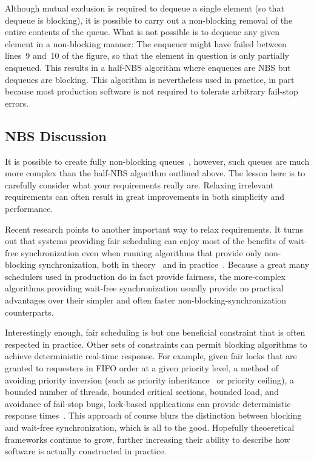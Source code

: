 Although mutual exclusion is required to dequeue a single element
(so that dequeue is blocking), it is possible to carry out a non-blocking
removal of the entire contents of the queue.
What is not possible is to dequeue any given element in a non-blocking
manner: The enqueuer might have failed between lines~9 and~10 of the
figure, so that the element in question is only partially enqueued.
This results in a half-NBS algorithm where enqueues are NBS but
dequeues are blocking.
This algorithm is nevertheless used in practice, in part because
most production software is not required to tolerate arbitrary fail-stop
errors.

\subsection{NBS Discussion}
\label{sec:advsync:NBS Discussion}

It is possible to create fully non-blocking queues~\cite{MichaelScott96},
however, such queues are much more complex than the half-NBS algorithm
outlined above.
The lesson here is to carefully consider what your requirements really are.
Relaxing irrelevant requirements can often result in great
improvements in both simplicity and performance.

Recent research points to another important way to relax requirements.
It turns out that systems providing fair scheduling can enjoy most
of the benefits of wait-free synchronization even when running
algorithms that provide only non-blocking
synchronization, both in theory~\cite{DanAlitarh2013PracticalProgress}
and in practice~\cite{SamyAlBahra2013NBS}.
Because a great many schedulers used in production do in fact
provide fairness,
the more-complex algorithms providing wait-free synchronization
usually provide no practical advantages over their simpler
and often faster non-blocking-synchronization counterparts.

Interestingly enough, fair scheduling is but one beneficial
constraint that is often respected in practice.
Other sets of constraints can permit blocking algorithms to
achieve deterministic real-time response.
For example, given fair locks that are granted to requesters in FIFO order at
a given priority level,
a method of avoiding priority inversion (such as priority
inheritance~\cite{Takada:1995:RSN:527074.828566,Cai-DongWang1996PrioInherLock}
or priority ceiling), a bounded number of threads,
bounded critical sections,
bounded load,
and avoidance of fail-stop bugs,
lock-based applications can provide deterministic
response times~\cite{BjoernBrandenburgPhD}.
This approach of course blurs the distinction between blocking and wait-free
synchronization, which is all to the good.
Hopefully theoeretical frameworks continue to grow, further increasing
their ability to
describe how software is actually constructed in practice.
